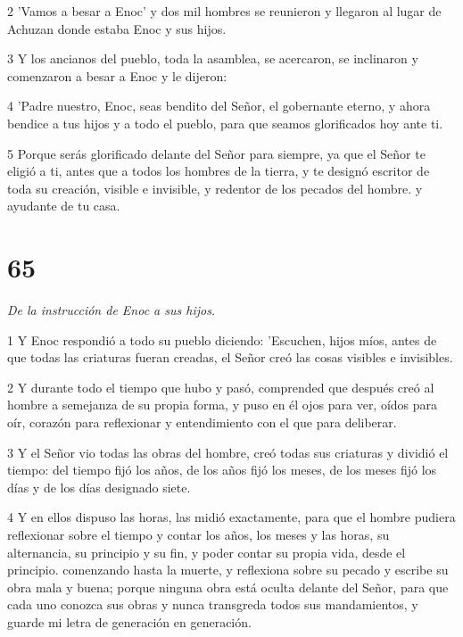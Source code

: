 \par 2 'Vamos a besar a Enoc' y dos mil hombres se reunieron y llegaron al lugar de Achuzan donde estaba Enoc y sus hijos.

\par 3 Y los ancianos del pueblo, toda la asamblea, se acercaron, se inclinaron y comenzaron a besar a Enoc y le dijeron:

\par 4 'Padre nuestro, Enoc, seas bendito del Señor, el gobernante eterno, y ahora bendice a tus hijos y a todo el pueblo, para que seamos glorificados hoy ante ti.

\par 5 Porque serás glorificado delante del Señor para siempre, ya que el Señor te eligió a ti, antes que a todos los hombres de la tierra, y te designó escritor de toda su creación, visible e invisible, y redentor de los pecados del hombre. y ayudante de tu casa.

\chapter{65}

\par \textit{De la instrucción de Enoc a sus hijos.}

\par 1 Y Enoc respondió a todo su pueblo diciendo: 'Escuchen, hijos míos, antes de que todas las criaturas fueran creadas, el Señor creó las cosas visibles e invisibles.

\par 2 Y durante todo el tiempo que hubo y pasó, comprended que después creó al hombre a semejanza de su propia forma, y ​​puso en él ojos para ver, oídos para oír, corazón para reflexionar y entendimiento con el que para deliberar.

\par 3 Y el Señor vio todas las obras del hombre, creó todas sus criaturas y dividió el tiempo: del tiempo fijó los años, de los años fijó los meses, de los meses fijó los días y de los días designado siete.

\par 4 Y en ellos dispuso las horas, las midió exactamente, para que el hombre pudiera reflexionar sobre el tiempo y contar los años, los meses y las horas, su alternancia, su principio y su fin, y poder contar su propia vida, desde el principio. comenzando hasta la muerte, y reflexiona sobre su pecado y escribe su obra mala y buena; porque ninguna obra está oculta delante del Señor, para que cada uno conozca sus obras y nunca transgreda todos sus mandamientos, y guarde mi letra de generación en generación.

